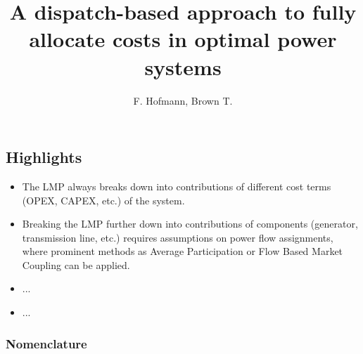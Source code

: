 \documentclass[11pt,twocolumn]{article}
\begin{document}
\title{A dispatch-based approach to fully allocate costs in optimal power systems}
\author{F. Hofmann, Brown T.}

\maketitle

\begin{abstract}
\end{abstract}


\subsection*{Highlights}
\begin{itemize}
 \item The LMP always breaks down into contributions of different cost terms (OPEX, CAPEX, etc.) of the system.
 \item Breaking the LMP further down into contributions of components (generator, transmission line, etc.) requires assumptions on power flow assignments, where prominent methods as Average Participation or Flow Based Market Coupling can be applied.
 \item ...
 \item ...
\end{itemize}





\subsubsection*{Nomenclature}
\end{document}
